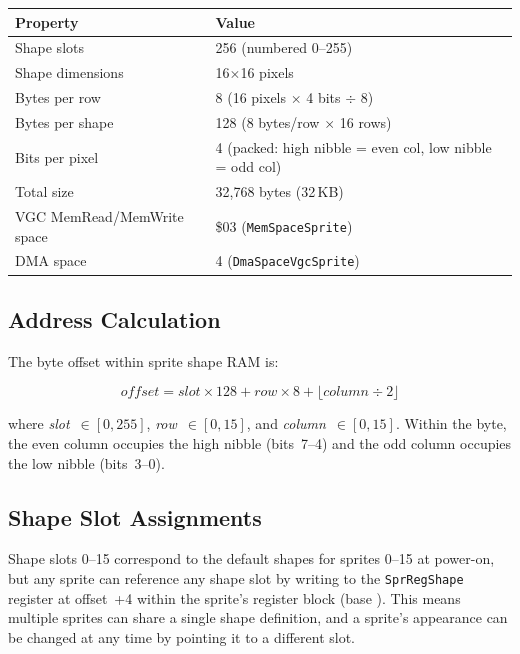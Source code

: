 \begin{center}
\small
\begin{tabular}{@{}ll@{}}
\toprule
\textbf{Property}         & \textbf{Value} \\
\midrule
Shape slots                & 256 (numbered 0--255) \\
Shape dimensions           & 16$\times$16 pixels \\
Bytes per row              & 8 (16 pixels $\times$ 4 bits $\div$ 8) \\
Bytes per shape            & 128 (8 bytes/row $\times$ 16 rows) \\
Bits per pixel             & 4 (packed: high nibble = even col, low nibble = odd col) \\
Total size                 & 32,768 bytes (32\,KB) \\
VGC MemRead/MemWrite space & \$03 (\texttt{MemSpaceSprite}) \\
DMA space                  & 4 (\texttt{DmaSpaceVgcSprite}) \\
\bottomrule
\end{tabular}
\end{center}

\subsection{Address Calculation}

The byte offset within sprite shape RAM is:

\[
  \textit{offset} = \textit{slot} \times 128 + \textit{row} \times 8 + \lfloor\textit{column} \div 2\rfloor
\]

where \textit{slot}~$\in [0, 255]$, \textit{row}~$\in [0, 15]$, and
\textit{column}~$\in [0, 15]$.  Within the byte, the even column occupies the
high nibble (bits~7--4) and the odd column occupies the low nibble (bits~3--0).

\subsection{Shape Slot Assignments}

\begin{notebox}
Shape slots 0--15 correspond to the default shapes for sprites 0--15 at
power-on, but any sprite can reference any shape slot by writing to the
\texttt{SprRegShape} register at offset~+4 within the sprite's register block
(base ).  This means multiple sprites can share a single shape
definition, and a sprite's appearance can be changed at any time by pointing it
to a different slot.
\end{notebox}

